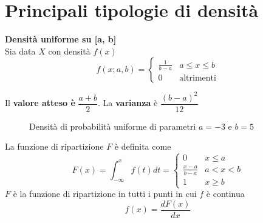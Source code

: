 \section{Principali tipologie di densità}

\begin{defn}
    \textbf{Densità uniforme su [a, b]} \\
    Sia data $ X $ con densità $ f(x) $
    \begin{equation*}
        f(x; a, b) = \begin{cases}
            \frac{1}{b-a} & a \leq x \leq b \\
            0   &    \text{altrimenti}
        \end{cases}
    \end{equation*}

    Il \textbf{valore atteso è} $ \dfrac{a + b}{2} $. La \textbf{varianza} è $
    \dfrac{(b - a)^2}{12}$

    \begin{figure}[htbp]
        \centering

        \caption{Densità di probabilità uniforme di parametri $a = -3$ e $b = 5$}
        \label{uniform}
    \end{figure}


    La funzione di ripartizione $F$ è definita come
    \begin{equation*}
        F(x) = \int_{-\infty}^x f(t) dt = \begin{cases}
            0 & x \leq a \\
            \frac{x-a}{b-a} & a < x < b \\
            1 & x \geq b
        \end{cases}
    \end{equation*}
    $ F $ è la funzione di ripartizione in tutti i punti in cui $ f $ è continua
    \begin{equation*}
        f(x) = \frac{dF(x)}{dx}
    \end{equation*}

    \begin{figure}[htbp]
        \centering


\end{figure}
\end{defn}
